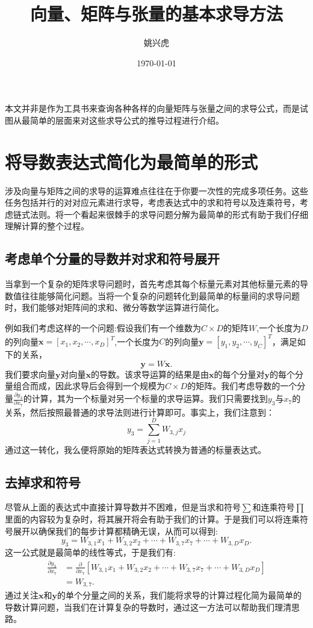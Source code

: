 \documentclass{ctexart}
\title{向量、矩阵与张量的基本求导方法}
\author{姚兴虎}
\date{\today}
\begin{document}
\maketitle
本文并非是作为工具书来查询各种各样的向量矩阵与张量之间的求导公式，而是试图从最简单的层面来对这些求导公式的推导过程进行介绍。
\section{将导数表达式简化为最简单的形式}
涉及向量与矩阵之间的求导的运算难点往往在于你要一次性的完成多项任务。这些任务包括并行的对对应元素进行求导，考虑表达式中的求和符号以及连乘符号，考虑链式法则。将一个看起来很棘手的求导问题分解为最简单的形式有助于我们仔细理解计算的整个过程。
\subsection{考虑单个分量的导数并对求和符号展开}
当拿到一个复杂的矩阵求导问题时，首先考虑其每个标量元素对其他标量元素的导数值往往能够简化问题。当将一个复杂的问题转化到最简单的标量间的求导问题时，我们能够对矩阵间的求和、微分等数学运算进行简化。

例如我们考虑这样的一个问题:假设我们有一个维数为$C×D$的矩阵$W$,一个长度为$D$的列向量$\mathbf{x}=[x_1,x_2,\cdots,x_D]^T$,一个长度为$C$的列向量$\mathbf{y}=[y_1,y_2,\cdots,y_C]^T$，满足如下的关系，
$$\mathbf{y} = W\mathbf{x}.$$
我们要求向量$\mathbf{y}$对向量$\mathbf{x}$的导数。该求导运算的结果是由$\mathbf{x}$的每个分量对$\mathbf{y}$的每个分量组合而成，因此求导后会得到一个规模为$C×D$的矩阵。我们考虑导数的一个分量$\frac{\partial y_3}{\partial{x_7}}$的计算，其为一个标量对另一个标量的求导运算。我们只需要找到$y_3$与$x_7$的关系，然后按照最普通的求导法则进行计算即可。事实上，我们注意到：
$$y_3 = \sum_{j=1}^D W_{3,j}x_j$$
通过这一转化，我么便将原始的矩阵表达式转换为普通的标量表达式。
\subsection{去掉求和符号}
尽管从上面的表达式中直接计算导数并不困难，但是当求和符号$\sum$和连乘符号$\prod$里面的内容较为复杂时，将其展开将会有助于我们的计算。于是我们可以将连乘符号展开以确保我们的每步计算都精确无误，从而可以得到:
$$y_3 = W_{3,1}x_1+W_{3,2}x_2 + \cdots +W_{3,7}x_7 +\cdots+ W_{3,D}x_D.$$
这一公式就是最简单的线性等式，于是我们有:
\begin{align*}
\frac{\partial y_3}{\partial x_7} &= \frac{\partial}{\partial x_7}[W_{3,1}x_1+W_{3,2}x_2 + \cdots +W_{3,7}x_7 +\cdots+ W_{3,D}x_D]\\
&= W_{3,7}.
\end{align*}
通过关注$\mathbf{x}$和$\mathbf{y}$的单个分量之间的关系，我们能将求导的计算过程化简为最简单的导数计算问题，当我们在计算复杂的导数时，通过这一方法可以帮助我们理清思路。
\end{document}
